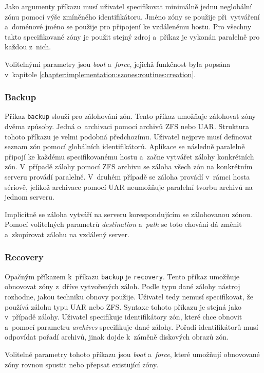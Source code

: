 Jako argumenty příkazu musí uživatel specifikovat minimálně jednu neglobální zónu pomocí výše zmíněného identifikátoru. Jméno zóny 
se použije při~vytváření a~doménové jméno se použije pro připojení ke vzdálenému hostu. Pro všechny takto specifikované zóny
je použit stejný zdroj a~příkaz je vykonán paralelně pro každou z~nich.

Volitelnými parametry jsou \textit{boot} a~\textit{force}, jejichž funkčnost byla popsána v~kapitole \ref{chapter:implementation:szones:routines:creation}.
\subsubsection{Backup}
\label{chapter:implementation:client:cli:backup}
Příkaz \verb|backup| slouží pro zálohování zón. Tento příkaz umožňuje zálohovat zóny dvěma způsoby. Jedná o~archivaci pomocí archivů ZFS nebo UAR.
Struktura tohoto příkazu je velmi podobná předchozímu. Uživatel nejprve musí definovat seznam zón pomocí globálních
identifikátorů. Aplikace se následně paralelně připojí ke každému specifikovanému hostu a~začne vytvářet zálohy konkrétních zón. 
V~případě zálohy pomocí ZFS archivu se záloha všech zón na konkrétním serveru provádí paralelně. V~druhém případě se záloha provádí v~rámci
hosta sériově, jelikož archivace pomocí UAR neumožňuje paralelní tvorbu archivů na jednom serveru.

Implicitně se záloha vytváří na serveru korespondujícím se zálohovanou zónou. Pomocí volitelných parametrů \textit{destination}
a~\textit{path} se toto chování dá změnit a~zkopírovat zálohu na vzdálený server.
\subsubsection{Recovery}
\label{chapter:implementation:client:cli:recovery}
Opačným příkazem k~příkazu \verb|backup| je \verb|recovery|. Tento příkaz umožňuje obnovovat zóny z~dříve vytvořených záloh.
Podle typu dané zálohy nástroj rozhodne, jakou techniku obnovy použije. Uživatel tedy nemusí specifikovat, že používá zálohu
typu UAR nebo ZFS. Syntaxe tohoto příkazu je stejná jako v~případě zálohy. Uživatel specifikuje identifikátory zón, které
chce obnovit a~pomocí parametru \textit{archives} specifikuje dané zálohy. Pořadí identifikátorů musí odpovídat pořadí archivů, jinak
dojde k~záměně diskových obrazů zón.

Volitelné parametry tohoto příkazu jsou \textit{boot} a~\textit{force}, které umožňují obnovované zóny rovnou spustit nebo
přepsat existující zóny.

